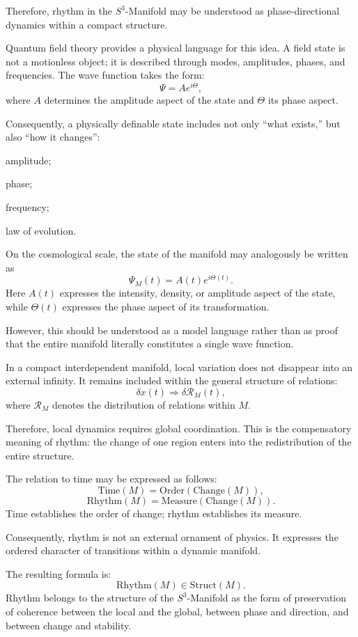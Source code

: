 \documentclass[12pt,a4paper]{article}
\theoremstyle{definition}
\begin{document}
Therefore, rhythm in the \(S^3\)-Manifold may be understood as phase-directional dynamics within a compact structure.

Quantum field theory provides a physical language for this idea. A field state is not a motionless object; it is described through modes, amplitudes, phases, and frequencies. The wave function takes the form:
\[
\Psi=Ae^{i\Theta},
\]
where \(A\) determines the amplitude aspect of the state and \(\Theta\) its phase aspect.

Consequently, a physically definable state includes not only ``what exists,'' but also ``how it changes'':

amplitude;

phase;

frequency;

law of evolution.

On the cosmological scale, the state of the manifold may analogously be written as
\[
\Psi_M(t)=A(t)e^{i\Theta(t)}.
\]
Here $A(t)$ expresses the intensity, density, or amplitude aspect of the state, while \(\Theta(t)\) expresses the phase aspect of its transformation.

However, this should be understood as a model language rather than as proof that the entire manifold literally constitutes a single wave function.

In a compact interdependent manifold, local variation does not disappear into an external infinity. It remains included within the general structure of relations:
\[
\delta x(t)\Rightarrow \delta\mathcal R_M(t),
\]
where \(\mathcal R_M\) denotes the distribution of relations within \(M\).

Therefore, local dynamics requires global coordination. This is the compensatory meaning of rhythm: the change of one region enters into the redistribution of the entire structure.

The relation to time may be expressed as follows:
\[
\mathrm{Time}(M)=\mathrm{Order}(\mathrm{Change}(M)),
\]
\[
\mathrm{Rhythm}(M)=\mathrm{Measure}(\mathrm{Change}(M)).
\]
Time establishes the order of change; rhythm establishes its measure.

Consequently, rhythm is not an external ornament of physics. It expresses the ordered character of transitions within a dynamic manifold.

The resulting formula is:
\[
\mathrm{Rhythm}(M)\in \mathrm{Struct}(M).
\]
Rhythm belongs to the structure of the \(S^3\)-Manifold as the form of preservation of coherence between the local and the global, between phase and direction, and between change and stability.
\end{document}
